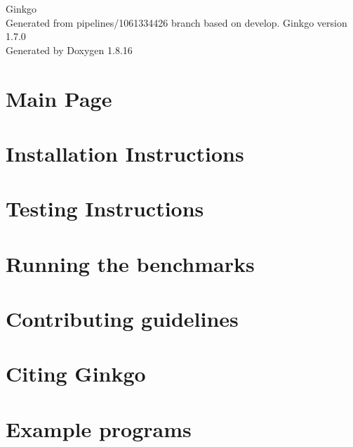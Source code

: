 \let\mypdfximage\pdfximage\def\pdfximage{\immediate\mypdfximage}\documentclass[twoside]{book}
\newcommand{\+}{\discretionary{\mbox{\scriptsize$\hookleftarrow$}}{}{}}
\newcommand{\clearemptydoublepage}{%
  \newpage{\pagestyle{empty}\cleardoublepage}%
}
\begin{document}
\hypersetup{pageanchor=false,
             bookmarksnumbered=true,
             pdfencoding=unicode
            }
\begin{titlepage}
\vspace*{7cm}
\begin{center}%
{\Large Ginkgo \\[1ex]\large Generated from pipelines/1061334426 branch based on develop. Ginkgo version 1.\+7.\+0 }\\
\vspace*{1cm}
{\large Generated by Doxygen 1.8.16}\\
\end{center}
\end{titlepage}
\clearemptydoublepage
{}
\tableofcontents
\clearemptydoublepage
{}
\hypersetup{pageanchor=true}

\chapter{Main Page}
\label{index}\hypertarget{index}{}
\chapter{Installation Instructions}
\label{install_ginkgo}

\chapter{Testing Instructions}
\label{testing_ginkgo}

\chapter{Running the benchmarks}
\label{benchmarking_ginkgo}

\chapter{Contributing guidelines}
\label{contributing_guidelines}

\chapter{Citing Ginkgo}
\label{citing_ginkgo}

\chapter{Example programs}
\label{Examples}

\end{document}
